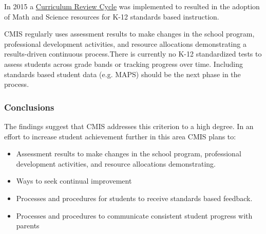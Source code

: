 \begin{findings}
In 2015 a \href{https://docs.google.com/a/cmis.ac.th/document/d/1hh1nLUlJgg1hd7s6aG3u3We0L6o7Wg_ECdjc2f6DcT8/edit?usp=sharing}{Curriculum Review Cycle} was implemented to resulted in the adoption of Math and Science resources for K-12 standards based instruction.


CMIS regularly uses assessment results to make changes in the school program, professional development activities, and resource allocations demonstrating a results-driven continuous process.There is currently no K-12 standardized tests to assess students across grade bands or tracking progress over time. Including standards based student data (e.g. MAPS) should be the next phase in the process.  
\end{findings}

\subsubsection{Conclusions}
The findings suggest that CMIS addresses this criterion to a high degree. In an effort to increase student achievement further in this area CMIS plans to:


\begin{itemize}
\item Assessment results to make changes in the school program, professional development activities, and resource allocations demonstrating.
\item Ways to seek continual improvement
\end{itemize}


\begin{itemize}
\item Processes and procedures for students to receive standards based feedback. 
\item Processes and procedures to communicate consistent student progress with parents
\end{itemize}



